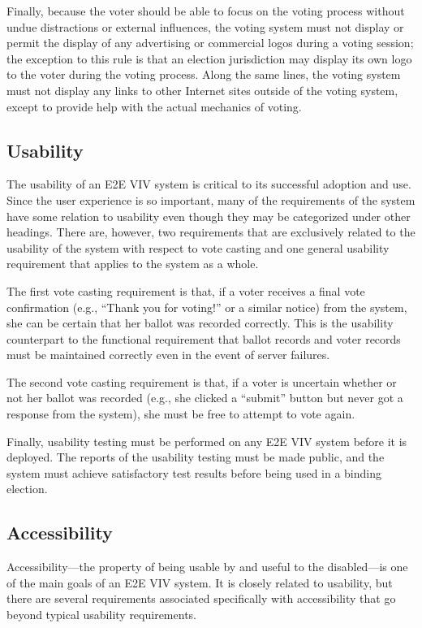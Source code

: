 Finally, because the voter should be able to focus on the voting
process without undue distractions or external influences, the voting
system must not display or permit the display of any advertising or
commercial logos during a voting session; the exception to this rule
is that an election jurisdiction may display its own logo to the voter
during the voting process. Along the same lines, the voting system
must not display any links to other Internet sites outside of the
voting system, except to provide help with the actual mechanics of
voting.

\subsection{Usability}

The usability of an E2E VIV system is critical to its successful
adoption and use. Since the user experience is so important, many of
the requirements of the system have some relation to usability even
though they may be categorized under other headings. There are,
however, two requirements that are exclusively related to the
usability of the system with respect to vote casting and one general
usability requirement that applies to the system as a whole.

The first vote casting requirement is that, if a voter receives a
final vote confirmation (e.g., ``Thank you for voting!'' or a similar
notice) from the system, she can be certain that her ballot was
recorded correctly. This is the usability counterpart to the
functional requirement that ballot records and voter records must be
maintained correctly even in the event of server failures.

The second vote casting requirement is that, if a voter is uncertain
whether or not her ballot was recorded (e.g., she clicked a ``submit''
button but never got a response from the system), she must be free
to attempt to vote again.

Finally, usability testing must be performed on any E2E VIV system
before it is deployed. The reports of the usability testing must be
made public, and the system must achieve satisfactory test results
before being used in a binding election.


\subsection{Accessibility}

Accessibility---the property of being usable by and useful to the
disabled---is one of the main goals of an E2E VIV system. It is
closely related to usability, but there are several requirements
associated specifically with accessibility that go beyond typical
usability requirements. 

